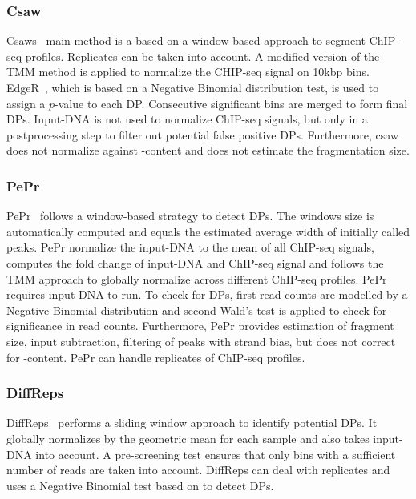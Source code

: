 \subsubsection{Csaw} Csaws~\citep{Aaron2014} main method is a based on a window-based approach to segment ChIP-seq profiles.
Replicates can be taken into account.
A modified version of the TMM method is applied to normalize the CHIP-seq signal on 10kbp bins.
EdgeR~\citep{robinson2010}, which is based on a Negative Binomial distribution test, is used to assign a $p$-value to each DP. 
Consecutive significant bins are merged to form final DPs. %
Input-DNA is not used to normalize ChIP-seq signals, but only in a postprocessing step to filter out potential false positive DPs.
Furthermore, csaw does not normalize against -content and does not estimate the fragmentation size. 

\subsubsection{PePr} PePr~\citep{Zhang2014} follows a window-based strategy to detect DPs.
The windows size is automatically computed and equals the estimated average width of initially called peaks.
PePr normalize the input-DNA to the mean of all ChIP-seq signals, computes the fold change of input-DNA and ChIP-seq signal and follows the TMM approach to globally normalize across different ChIP-seq profiles. 
PePr requires input-DNA to run.
To check for DPs, first read counts are modelled by a Negative Binomial distribution and second Wald's test is applied to check for significance in read counts. 
Furthermore, PePr provides estimation of fragment size, input subtraction, filtering of peaks with strand bias, but does not correct for -content.
PePr can handle replicates of ChIP-seq profiles.

\subsubsection{DiffReps} 
DiffReps~\citep{Li2013} performs a sliding window approach to identify potential DPs. 
It globally normalizes by the geometric mean for each sample and also takes input-DNA into account.
A pre-screening test ensures that only bins with a sufficient number of reads are taken into account.
DiffReps can deal with replicates and uses a Negative Binomial test based on \cite{anders2010} to detect DPs.

